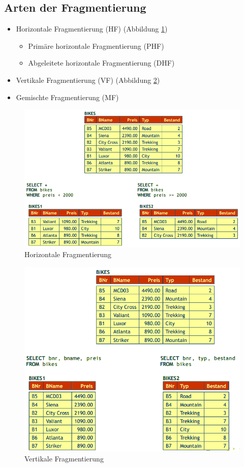 \documentclass[a4paper,11pt]{article}
\begin{document}
\subsection{Arten der Fragmentierung}
\begin{itemize}
\item Horizontale Fragmentierung (HF) (Abbildung \ref{fig:horizontalFrag})
\begin{itemize}
\item Primäre horizontale Fragmentierung (PHF)
\item Abgeleitete horizontale Fragmentierung (DHF)
\end{itemize}
\item Vertikale Fragmentierung (VF) (Abbildung \ref{fig:verticalFrag})
\item Gemischte Fragmentierung (MF)
\end{itemize}
\begin{figure}[ht]
  \includegraphics[scale=0.75]{src/horizontale_fragmentierung.png}
	\caption{Horizontale Fragmentierung}
	\label{fig:horizontalFrag}
\end{figure}
\begin{figure}[ht]
  \includegraphics[scale=0.75]{src/vertikale_fragmentierung.png}
	\caption{Vertikale Fragmentierung}
	\label{fig:verticalFrag}
\end{figure}
\end{document}

